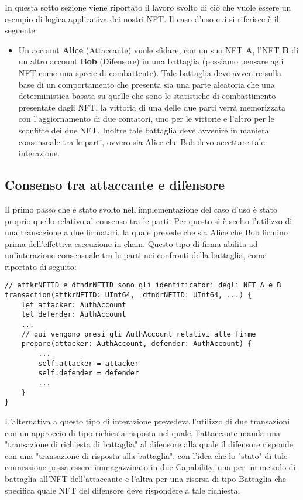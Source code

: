 In questa sotto sezione viene riportato il lavoro svolto di ciò che vuole essere un esempio di logica applicativa dei nostri NFT. Il caso d'uso cui si riferisce è il seguente: 
\begin{itemize}
	\item[] Un account \textbf{Alice} (Attaccante) vuole sfidare, con un suo NFT \textbf{A}, l'NFT \textbf{B} di un altro account \textbf{Bob} (Difensore) in una battaglia (possiamo pensare agli NFT come una specie di combattente). Tale battaglia deve avvenire sulla base di un comportamento che presenta sia una parte aleatoria che una deterministica basata su quelle che sono le statistiche di combattimento presentate dagli NFT, la vittoria di una delle due parti verrà memorizzata con l'aggiornamento di due contatori, uno per le vittorie e l'altro per le sconfitte dei due NFT. Inoltre tale battaglia deve avvenire in maniera consensuale tra le parti, ovvero sia Alice che Bob devo accettare tale interazione.
\end{itemize}

\subsection{Consenso tra attaccante e difensore}
Il primo passo che è stato svolto nell'implementazione del caso d'uso è stato proprio quello relativo al consenso tra le parti. Per questo si è scelto l'utilizzo di una transazione a due firmatari, la quale prevede che sia Alice che Bob firmino prima dell'effettiva esecuzione in chain. Questo tipo di firma abilita ad un'interazione consensuale tra le parti nei confronti della battaglia, come riportato di seguito:
\begin{lstlisting}[style=all, style=cadence]
// attkrNFTID e dfndrNFTID sono gli identificatori degli NFT A e B
transaction(attkrNFTID: UInt64,  dfndrNFTID: UInt64, ...) {
    let attacker: AuthAccount
    let defender: AuthAccount
    ...
	// qui vengono presi gli AuthAccount relativi alle firme
	prepare(attacker: AuthAccount, defender: AuthAccount) {
		...
		self.attacker = attacker
    	self.defender = defender
    	...
	}
}
\end{lstlisting}
L'alternativa a questo tipo di interazione prevedeva l'utilizzo di due transazioni con un approccio di tipo richiesta-risposta nel quale, l'attaccante manda una "transazione di richiesta di battaglia" al difensore alla quale il difensore risponde con una "transazione di risposta alla battaglia", con l'idea che lo "stato" di tale connessione possa essere immagazzinato in due Capability, una per un metodo di battaglia all'NFT dell'attaccante e l'altra per una risorsa di tipo Battaglia che specifica quale NFT del difensore deve rispondere a tale richiesta. 

